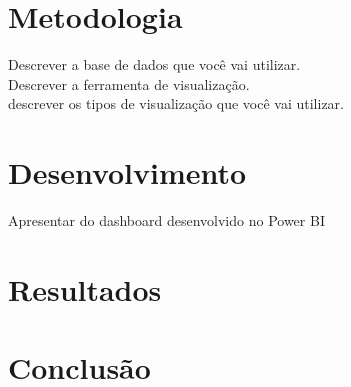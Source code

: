  
 

\section{\esp Metodologia}

{\color{red} Descrever a base de dados que você vai utilizar. \\ Descrever a ferramenta de visualização. \\ descrever os tipos de visualização que você vai utilizar. }



\section{\esp Desenvolvimento}

{\color{red} Apresentar do dashboard desenvolvido no Power BI}

\section{\esp Resultados}

\section{\esp Conclusão}









% 
